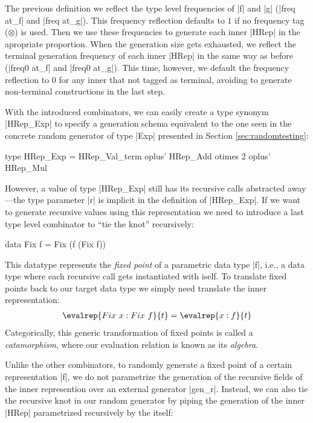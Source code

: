The previous definition we reflect the type level frequencies of |f| and |g|
(|freq at_f| and |freq at_g|).
%
This frequency reflection defaults to $1$ if no frequency tag ($\otimes$) is
used.
%
Then we use these frequencies to generate each inner |HRep| in the apropriate
proportion.
%
When the generation size gets exhausted, we reflect the terminal generation
frequency of each inner |HRep| in the same way as before (|freq0 at_f| and
|freq0 at_g|).
%
This time, however, we default the frequency reflection to $0$ for any inner
that not tagged as terminal, avoiding to generate non-terminal constructions in
the last step.


With the introduced combinators, we can easily create a type synonym |HRep_Exp|
to specify a generation schema equivalent to the one seen in the concrete random
generator of type |Exp| presented in Section \ref{sec:randomtesting}:

\begin{code}
type HRep_Exp  =       HRep_Val_term
               oplus'  HRep_Add  otimes 2
               oplus'  HRep_Mul
\end{code}

However, a value of type |HRep_Exp| still has its recursive calls abstracted
away---the type parameter |r| is implicit in the definition of |HRep_Exp|.
%
If we want to generate recursive values using this representation we need to
introduce a last type level combinator to ``tie the knot'' recursively:

\begin{code}
  data Fix f = Fix (f (Fix f))
\end{code}

This datatype represents the \emph{fixed point} of a parametric data type |f|,
i.e., a data type where each recursive call gets instantiated with iself.
%
To translate fixed points back to our target data type we simply need translate
the inner representation:
%
\begin{align*}
  \evalrep{Fix\ x : Fix\ f}{t} = \evalrep{x : f}{t}
\end{align*}
%
Categorically, this generic transformation of fixed points is called a
\emph{catamorphism}, where our evaluation relation is known as its
\emph{algebra}.


Unlike the other combinators, to randomly generate a fixed point of a certain
representation |f|, we do not parametrize the generation of the recursive fields
of the inner represention over an external generator |gen_r|.
%
Instead, we can also tie the recursive knot in our random generator by piping
the generation of the inner |HRep| parametrized recursively by the itself:

